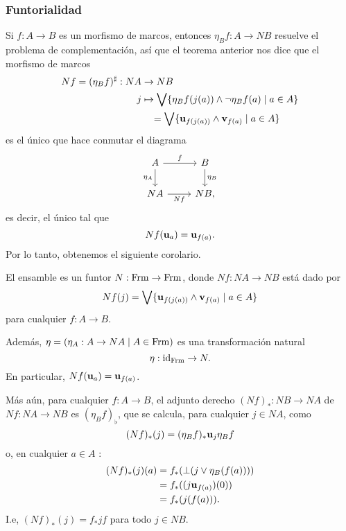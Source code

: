 \subsubsection{Funtorialidad}

Si $f:A\to B$ es un morfismo de marcos, entonces
$\eta_Bf:A\to NB$ resuelve
el problema de complementación, así que el teorema anterior nos dice
que el morfismo de marcos
\begin{align}
  Nf=(\eta_Bf)^{\sharp}:NA&\to NB \\
  j&\mapsto \bigvee\{\eta_Bf(j(a)) \wedge \neg \eta_Bf(a)\mid a\in A\} \\
   &\quad =\bigvee\{\mathbf u_{f(j(a))} \wedge \mathbf v_{f(a)}\mid a\in A\}
\end{align}
es el único que hace conmutar el diagrama
\begin{equation}
  \begin{tikzcd}
    A \ar[r,"f"] \ar[d,"\eta_A"'] & B \ar[d,"\eta_B"] \\
    NA \ar[r,"Nf"'] & NB,
  \end{tikzcd}
\end{equation}
es decir, el único tal que
\begin{equation}
  Nf(\mathbf u_{a}) = \mathbf u_{f(a)}
.\end{equation}
Por lo tanto, obtenemos el siguiente corolario.
\begin{cor}
  El ensamble es un funtor $N:\mathrm{Frm}\to\mathrm{Frm}$, donde $Nf:NA\to NB$ 
  está dado por
  \begin{equation}
    Nf(j) = \bigvee\{\mathbf u_{f(j(a))} \wedge \mathbf v_{f(a)}\mid a\in A\}
  \end{equation}
  para cualquier $f:A\to B$.

  Además, $\eta=(\eta_A:A\to NA\mid A\in\mathrm{Frm})$ es una transformación
  natural
  \begin{equation}
    \eta:\mathrm{id}_{\mathrm{Frm}} \to N
  .\end{equation}
  En particular, $Nf(\mathbf u_{a}) = \mathbf u_{f(a)}$.

  Más aún, para cualquier $f:A\to B$, el adjunto derecho $(Nf)_*:NB\to
  NA$ de $Nf:NA\to NB$ es $(\eta_Bf)_\flat$, que se calcula, para
  cualquier $j\in NA$, como
  \begin{equation}
    (Nf)_*(j) = (\eta_Bf)_*\mathbf u_{j}\eta_Bf
  \end{equation}
  o, en cualquier $a\in A$ :
  \begin{align}
    (Nf)_*(j)(a)
    &= f_*(\bot(j\vee\eta_B(f(a)))) \\
    &= f_*((j\mathbf u_{f(a)})(0)) \\
    &= f_*(j(f(a)))
  .\end{align}
  I.e, $(Nf)_*(j) = f_*jf$ para todo $j\in NB$.
\end{cor}

